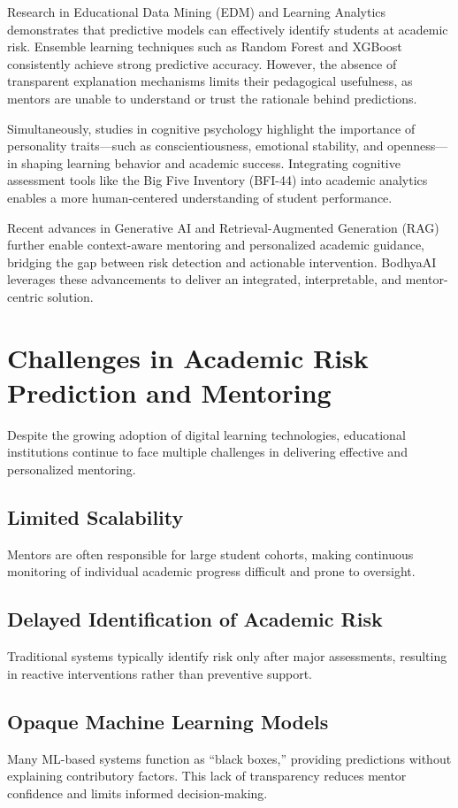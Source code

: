 \documentclass[12pt,a4paper]{report}
\begin{document}
Research in Educational Data Mining (EDM) and Learning Analytics demonstrates that predictive models can effectively identify students at academic risk. Ensemble learning techniques such as Random Forest and XGBoost consistently achieve strong predictive accuracy. However, the absence of transparent explanation mechanisms limits their pedagogical usefulness, as mentors are unable to understand or trust the rationale behind predictions.

Simultaneously, studies in cognitive psychology highlight the importance of personality traits—such as conscientiousness, emotional stability, and openness—in shaping learning behavior and academic success. Integrating cognitive assessment tools like the Big Five Inventory (BFI-44) into academic analytics enables a more human-centered understanding of student performance.

Recent advances in Generative AI and Retrieval-Augmented Generation (RAG) further enable context-aware mentoring and personalized academic guidance, bridging the gap between risk detection and actionable intervention. BodhyaAI leverages these advancements to deliver an integrated, interpretable, and mentor-centric solution.

\section{Challenges in Academic Risk Prediction and Mentoring}

Despite the growing adoption of digital learning technologies, educational institutions continue to face multiple challenges in delivering effective and personalized mentoring.

\subsection{Limited Scalability}
Mentors are often responsible for large student cohorts, making continuous monitoring of individual academic progress difficult and prone to oversight.

\subsection{Delayed Identification of Academic Risk}
Traditional systems typically identify risk only after major assessments, resulting in reactive interventions rather than preventive support.

\subsection{Opaque Machine Learning Models}
Many ML-based systems function as ``black boxes,'' providing predictions without explaining contributory factors. This lack of transparency reduces mentor confidence and limits informed decision-making.
\end{document}
